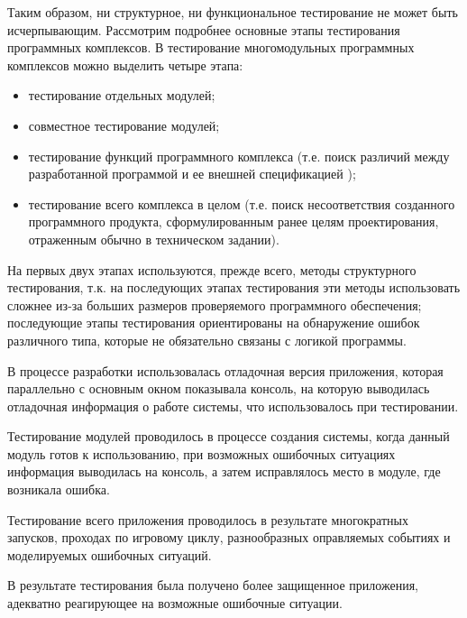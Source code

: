 Таким образом, ни структурное, ни функциональное тестирование не может быть исчерпывающим. Рассмотрим подробнее основные этапы тестирования программных комплексов. В тестирование многомодульных программных комплексов можно выделить четыре этапа:
\begin{itemize}

\item тестирование отдельных модулей; 

\item совместное тестирование модулей; 

\item тестирование функций программного комплекса (т.е. поиск различий между разработанной программой и ее внешней спецификацией ); 

\item тестирование всего комплекса в целом (т.е. поиск несоответствия созданного программного продукта, сформулированным ранее целям проектирования, отраженным обычно в техническом задании). 
\end{itemize}

На первых двух этапах используются, прежде всего, методы структурного тестирования, т.к. на последующих этапах тестирования эти методы использовать сложнее из-за больших размеров проверяемого программного обеспечения; последующие этапы тестирования ориентированы на обнаружение ошибок различного типа, которые не обязательно связаны с логикой программы.

В процессе разработки использовалась отладочная версия приложения, которая параллельно с основным окном показывала консоль, на которую выводилась отладочная информация о работе системы, что использовалось при тестировании.

Тестирование модулей проводилось в процессе создания системы, когда данный модуль готов к использованию, при возможных ошибочных ситуациях информация выводилась на консоль, а затем исправлялось место в модуле, где возникала ошибка. 

Тестирование всего приложения проводилось  в результате многократных запусков, проходах по игровому циклу, разнообразных оправляемых событиях и моделируемых ошибочных ситуаций.

В результате тестирования была получено более защищенное приложения, адекватно реагирующее на возможные ошибочные ситуации.